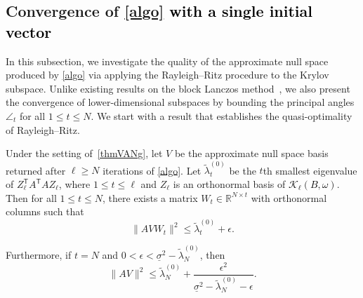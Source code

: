 \documentclass{siamart190516}
\newcommand{\Ttran}{\mathsf{T}}
\newcommand{\R}{\mathbb{R}}
\providecommand{\norm}[1]{\lVert#1\rVert}
\newcommand{\edit}[1]{\textcolor{black}{#1}} %
\begin{document}
\subsection{Convergence of \cref{algo} \edit{with a single initial vector}}

In this subsection, we investigate the quality of the approximate null space produced by \cref{algo} via applying the Rayleigh--Ritz procedure to the Krylov subspace.
Unlike existing results on the block Lanczos method~\cite{Li2015}, we also present the convergence of lower-dimensional subspaces by bounding the principal angles $\angle_{t}$ for all $1 \leq t \leq N$. We start with a result that establishes the quasi-optimality of Rayleigh--Ritz.

\begin{lemma}
    \label{lemAVW}
    Under the setting of~\cref{thmVANg}, let $V$ be the approximate null space basis returned after $\ell\geq N$ iterations of \cref{algo}.
    Let $\tilde{\lambda}_{t}^{(0)}$ be the $t$th smallest eigenvalue of $Z_{\ell}^{\Ttran}A^{\Ttran}AZ_{\ell}$, where $1\leq t\leq \ell$ and $Z_{\ell}$ is an orthonormal basis of \edit{$\mathcal{K}_{\ell}(B,\omega)$}.
    Then for all $1\leq t\leq N$, there exists a matrix $W_{t}\in\R^{N\times t}$ with orthonormal columns such that 
    \begin{equation}
        \label{estAVWt}  
        \norm{AVW_{t}}^{2} \leq \tilde{\lambda}_{t}^{(0)} +\epsilon.
    \end{equation}

    Furthermore, if $t=N$ and $0<\epsilon<\underline{\sigma}^{2}-\tilde \lambda_N^{(0)}$, then 
    \begin{equation}
        \label{estAVWN}
        \norm{AV}^{2} \leq \tilde{\lambda}_{N}^{(0)} +\frac{\epsilon^{2}}{\underline{\sigma}^{2}-\tilde{\lambda}_{N}^{(0)} - \epsilon}.
    \end{equation}
\end{lemma}
\end{document}

